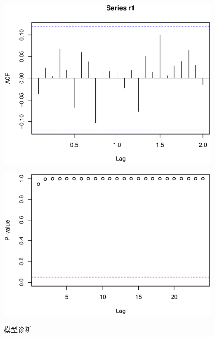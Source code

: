 \documentclass[10.5pt,onecolumn,a4paper]{article}%
\begin{document}
\begin{figure}[h!]
    \caption{模型诊断} \label{fg:check}
    \begin{multicols}{2}
        \begin{minipage}[h]{0.5\textwidth} 
            \centering   
            \includegraphics[width=1\textwidth]{pic/acfr1.eps}   
               \label{fig:acfr1}   
        \end{minipage}
        \begin{minipage}[h]{0.5\textwidth}   
            \centering   
            \includegraphics[width=1\textwidth]{pic/mc_gr_ast.eps} 
            \label{fig:mcgrast}   
        \end{minipage}
    \end{multicols}
\end{figure}
\end{document}
